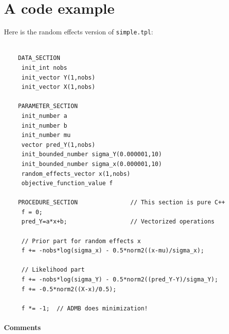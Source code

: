 \documentclass[12pt,letter,reqno]{book}
\begin{document}
\section{A code example\label{sec:code example}}

Here is the random effects version of \texttt{simple.tpl}:
\begin{lstlisting}

    DATA_SECTION
     init_int nobs
     init_vector Y(1,nobs)
     init_vector X(1,nobs)

    PARAMETER_SECTION
     init_number a
     init_number b
     init_number mu
     vector pred_Y(1,nobs)
     init_bounded_number sigma_Y(0.000001,10)
     init_bounded_number sigma_x(0.000001,10)
     random_effects_vector x(1,nobs)
     objective_function_value f

    PROCEDURE_SECTION               // This section is pure C++
     f = 0;
     pred_Y=a*x+b;                  // Vectorized operations

     // Prior part for random effects x
     f += -nobs*log(sigma_x) - 0.5*norm2((x-mu)/sigma_x);

     // Likelihood part
     f += -nobs*log(sigma_Y) - 0.5*norm2((pred_Y-Y)/sigma_Y);
     f += -0.5*norm2((X-x)/0.5);

     f *= -1;  // ADMB does minimization!

\end{lstlisting}

\paragraph{Comments}
\end{document}
